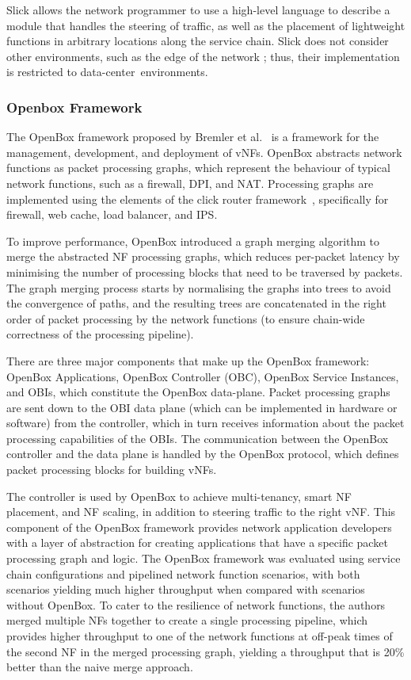 \documentclass[futureinternet,review,accept,pdftex,moreauthors]{Definitions/mdpi}
\begin{document}
Slick allows the network programmer to use a high-level language to describe a module that handles the steering of traffic, as well as the placement of lightweight functions in arbitrary locations along the service chain. Slick does not consider other environments, such as the edge of the network ; thus, their implementation is restricted to data-center~\mbox{environments}. 

\subsubsection{Openbox Framework}
\label{OpenBox}
The OpenBox framework proposed by Bremler {et al.}~\cite{bremler2016openbox} is a framework for the management, development, and deployment of vNFs. OpenBox abstracts network functions as packet processing graphs, which represent the behaviour of typical network functions, such as a firewall, DPI, and NAT. Processing graphs are implemented using the elements of the click router framework~\cite{kohler2000click}, specifically for firewall, web cache, load balancer, and IPS. 

To improve performance, OpenBox introduced a graph merging algorithm to merge the abstracted NF processing graphs, which reduces per-packet latency by minimising the number of processing blocks that need to be traversed by packets. The graph merging process starts by normalising the graphs into trees to avoid the convergence of paths, and the resulting trees are concatenated in the right order of packet processing by the network functions (to ensure chain-wide correctness of the processing pipeline).

There are three major components that make up the OpenBox framework: OpenBox Applications, OpenBox Controller (OBC), OpenBox Service Instances, and OBIs, which constitute the OpenBox data-plane. Packet processing graphs are sent down to the OBI data plane (which can be implemented in hardware or software) from the controller, which in turn receives information about the packet processing capabilities of the OBIs. The communication between the OpenBox controller and the data plane is handled by the OpenBox protocol, which defines packet processing blocks for building vNFs.

The controller is used by OpenBox to achieve multi-tenancy, smart NF placement, and NF scaling, in addition to steering traffic to the right vNF. This component of the OpenBox framework provides network application developers with a layer of abstraction for creating applications that have a specific packet processing graph and logic. The OpenBox framework was evaluated using service chain configurations and pipelined network function scenarios, with both scenarios yielding much higher throughput when compared with scenarios without OpenBox. To cater to the resilience of network functions, the authors merged multiple NFs together to create a single processing pipeline, which provides higher throughput to one of the network functions at off-peak times of the second NF in the merged processing graph, yielding a throughput that is 20\% better than the naive merge approach.  
\end{document}

